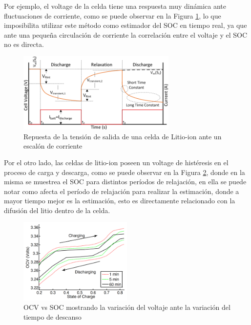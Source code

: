 \documentclass[10pt,a4paper]{article}
\begin{document}
\noindent Por ejemplo, el voltage de la celda tiene una respuesta muy din\'amica
ante fluctuaciones de corriente, como se puede observar en la Figura
\ref{relaxation_ocv}, lo que imposibilita utilizar este m\'etodo como estimador
del \acrshort{SOC} en tiempo real, ya que ante una pequeña circulaci\'on de
corriente la correlaci\'on entre el voltaje y el \acrshort{SOC} no es directa.

\begin{figure}[h!]
    \begin{center}
        \includegraphics[width=0.7\textwidth]{ocv_relaxation.png}
        \caption{Repuesta de la tensi\'on de salida de una celda de Litio-ion
        ante un escal\'on de corriente}
        \label{relaxation_ocv}
    \end{center}
\end{figure}

\noindent Por el otro lado, las celdas de litio-ion poseen un voltage de
hist\'eresis en el proceso de carga y descarga, como se puede observar en la
Figura \ref{histeresis_plot}, donde en la misma se muestrea el \acrshort{SOC}
para distintos per\'iodos de relajaci\'on, en ella se puede notar como
afecta el per\'iodo de relajaci\'on para realizar la estimaci\'on, donde a
mayor tiempo mejor es la estimaci\'on, esto es directamente relacionado con la
difusi\'on del litio dentro de la celda.

\begin{figure}[h!]
    \begin{center}
        \includegraphics[width=0.5\textwidth]{soc_histeresis.png}
        \caption{\acrshort{OCV} vs \acrshort{SOC} mostrando la variaci\'on del
        voltaje ante la variaci\'on del tiempo de descanso} 
        \label{histeresis_plot}
    \end{center}
\end{figure}
\end{document}
